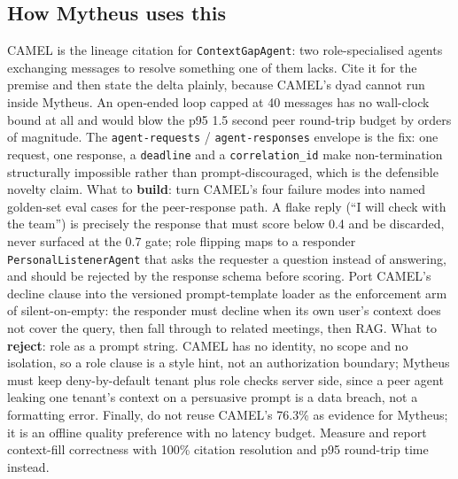 \subsection{How Mytheus uses this}
\begin{takeaway}
CAMEL is the lineage citation for \texttt{ContextGapAgent}: two role-specialised agents exchanging messages to resolve something one of them lacks. Cite it for the premise and then state the delta plainly, because CAMEL's dyad cannot run inside Mytheus. An open-ended loop capped at 40 messages has no wall-clock bound at all and would blow the p95 1.5 second peer round-trip budget by orders of magnitude. The \texttt{agent-requests} / \texttt{agent-responses} envelope is the fix: one request, one response, a \texttt{deadline} and a \texttt{correlation\_id} make non-termination structurally impossible rather than prompt-discouraged, which is the defensible novelty claim. What to \textbf{build}: turn CAMEL's four failure modes into named golden-set eval cases for the peer-response path. A flake reply (``I will check with the team'') is precisely the response that must score below 0.4 and be discarded, never surfaced at the 0.7 gate; role flipping maps to a responder \texttt{PersonalListenerAgent} that asks the requester a question instead of answering, and should be rejected by the response schema before scoring. Port CAMEL's decline clause into the versioned prompt-template loader as the enforcement arm of silent-on-empty: the responder must decline when its own user's context does not cover the query, then fall through to related meetings, then RAG. What to \textbf{reject}: role as a prompt string. CAMEL has no identity, no scope and no isolation, so a role clause is a style hint, not an authorization boundary; Mytheus must keep deny-by-default tenant plus role checks server side, since a peer agent leaking one tenant's context on a persuasive prompt is a data breach, not a formatting error. Finally, do not reuse CAMEL's 76.3\% as evidence for Mytheus; it is an offline quality preference with no latency budget. Measure and report context-fill correctness with 100\% citation resolution and p95 round-trip time instead.
\end{takeaway}

